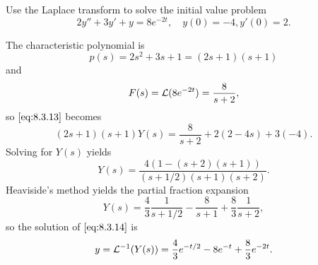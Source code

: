 \documentclass{ximera}
\begin{document}
\begin{example}\label{example:8.3.3}
 Use the Laplace transform to solve the
initial value problem
\begin{equation}\label{eq:8.3.14}
2y''+3y'+y=8e^{-2t}, \quad   y(0)=-4,  y'(0)=2.
\end{equation}

\begin{explanation}
The characteristic polynomial is
$$
p(s)=2s^2+3s+1=(2s+1)(s+1)
$$
 and
$$
F(s)={\cal L}(8e^{-2t})=\frac{8}{s+2},
$$
so $\eqref{eq:8.3.13}$ becomes
$$
(2s+1)(s+1)Y(s)=\frac{8}{s+2}+2(2-4s)+3(-4).
$$
Solving  for $Y(s)$ yields
$$
Y(s)=\frac{4\left(1-(s+2)(s+1)\right)}{(s+1/2)(s+1)(s+2)}.
$$
Heaviside's method yields the partial fraction expansion
$$
Y(s)=\frac{4}{3}\frac{1}{s+1/2}-\frac{8}{s+1}+\frac{8}{3}\frac{1}{s+2},
$$
so the solution of  $\eqref{eq:8.3.14}$ is
$$
y={\cal L}^{-1}(Y(s))=\frac{4}{3}e^{-t/2}-8e^{-t}+\frac{8}{3}e^{-2t}.
$$

\begin{center}
\end{center}

\end{explanation}
\end{example}

\end{document}
